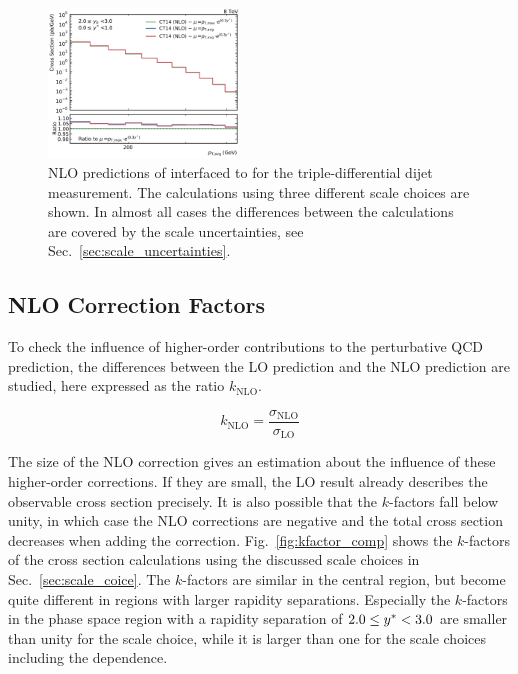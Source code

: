 \begin{figure}[htp]
    \includegraphics[width=0.45\textwidth]{figures/theory/nlo_xs_comp_yb2ys0.pdf}
    \caption[fastNLO prediction of triple-differential dijet cross section]{NLO predictions of \fastNLO interfaced to \NLOJETPP for the
        triple-differential dijet measurement. The
    calculations using three different scale choices are shown. In almost all cases
    the differences between the calculations are covered by the scale
    uncertainties, see Sec.~\ref{sec:scale_uncertainties}.}
    \label{fig:xs_nlo_comp}
\end{figure}


\subsection{NLO Correction Factors}
\label{sec:k_factors}

To check the influence of higher-order contributions to the perturbative QCD
prediction, the differences between the LO prediction and the NLO
prediction are studied, here expressed as the ratio $k_\mathrm{NLO}$.

\begin{equation*}
    k_{\mathrm{NLO}} = \frac{\sigma_{\mathrm{NLO}}}{\sigma_{\mathrm{LO}}}
\end{equation*}

The size of the NLO correction gives an estimation about the influence of these
higher-order corrections. If they are small, the LO result already describes the
observable cross section precisely. It is also possible that the $k$-factors
fall below unity, in which case the NLO corrections are negative and the total cross
section decreases when adding the correction.  Fig.~\ref{fig:kfactor_comp} shows
the $k$-factors of the \NLOJETPP cross section calculations using the discussed
scale choices in Sec.~\ref{sec:scale_coice}. The $k$-factors are similar in the
central region, but become quite different in regions with larger rapidity
separations.  Especially the $k$-factors in the phase space region with a
rapidity separation of $2.0 \leq y^* < 3.0$ are smaller than unity for the
\ptavg scale choice, while it is larger than one for the scale choices including
the \ystar dependence.

